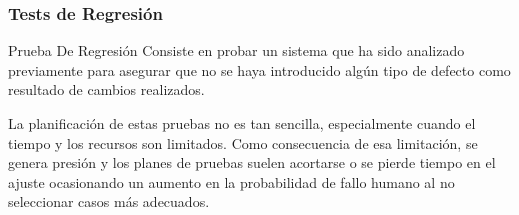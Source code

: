 \begin{frame}
    \frametitle{Tests de Regresión}
    \begin{block}{Prueba De Regresión}
        Consiste en probar un sistema que ha sido  
        analizado previamente para asegurar que no se haya introducido 
        algún tipo de  defecto  como resultado de cambios realizados.
\end{block}


La planificación de estas pruebas no es tan sencilla, especialmente
cuando el tiempo y los recursos son limitados. Como consecuencia 
de esa limitación, se genera presión y  los planes de pruebas suelen 
acortarse o se pierde tiempo en el ajuste ocasionando un aumento en 
la probabilidad de fallo humano al no seleccionar casos más adecuados.
\end{frame}